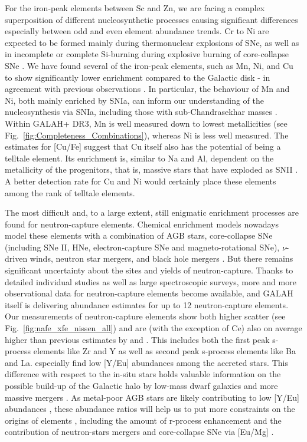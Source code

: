 \documentclass[fleqn,usenatbib]{mnras}
\begin{document}
For the iron-peak elements between Sc and Zn, we are facing a complex superposition of different nucleosynthetic processes causing significant differences especially between odd and even element abundance trends. Cr to Ni are expected to be formed mainly during thermonuclear explosions of SNe, as well as in incomplete or complete Si-burning during explosive burning of core-collapse SNe \citep{Kobayashi2006,Kobayashi2020}. We have found several of the iron-peak elements, such as Mn, Ni, and Cu to show significantly lower enrichment compared to the Galactic disk - in agreement with previous observations \citep{Nissen2010, Nissen2011, Hawkins2015, Hayes2018}. In particular, the behaviour of Mn and Ni, both mainly enriched by SNIa, can inform our understanding of the nucleosynthesis via SNIa, including those with sub-Chandrasekhar masses \citep{Kobayashi2020b,delosReyes2020,Sanders2021}. Within GALAH+ DR3, Mn is well measured down to lowest metallicities (see Fig.~\ref{fig:Completeness_Combinations}), whereas Ni is less well measured. The estimates for [Cu/Fe] suggest that Cu itself also has the potential of being a telltale element. Its enrichment is, similar to Na and Al, dependent on the metallicity of the progenitors, that is, massive stars that have exploded as SNII \citep{Kobayashi2006,Kobayashi2020}. A better detection rate for Cu and Ni would certainly place these elements among the rank of telltale elements.

The most difficult and, to a large extent, still enigmatic enrichment processes are found for neutron-capture elements. Chemical enrichment models nowadays model these elements with a combination of AGB stars, core-collapse SNe (including SNe II, HNe, electron-capture SNe and magneto-rotational SNe), $\nu$-driven winds, neutron star mergers, and black hole mergers \citep[see][and references therein]{Kobayashi2020}. But there remains significant uncertainty about the sites and yields of neutron-capture. Thanks to detailed individual studies as well as large spectroscopic surveys, more and more observational data for neutron-capture elements become available, and GALAH itself is delivering abundance estimates for up to 12 neutron-capture elements. Our measurements of neutron-capture elements show both higher scatter (see Fig.~\ref{fig:nafe_xfe_nissen_all}) and are (with the exception of Ce) also on average higher than previous estimates by \citet{Nissen2011} and \citet{Fishlock2017}. This includes both the first peak s-process elements like Zr and Y as well as second peak s-process elements like Ba and La. \citet{Fishlock2017} especially find low [Y/Eu] abundances among the accreted stars. This difference with respect to the in-situ stars holds valuable information on the possible build-up of the Galactic halo by low-mass dwarf galaxies and more massive mergers \citep{Venn2004}. As metal-poor AGB stars are likely contributing to low [Y/Eu] abundances \citep{Venn2004}, these abundance ratios will help us to put more constraints on the origins of elements \citep[see also][]{Recio-Blanco2021}, including the amount of r-process enhancement \citep{Aguado2021} and the contribution of neutron-stars mergers and core-collapse SNe via [Eu/Mg] \citep{Matsuno2021}.
\end{document}
